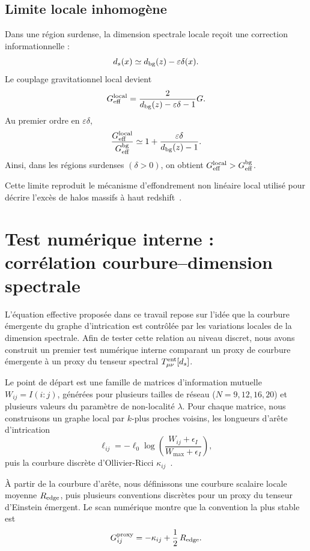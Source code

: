 \documentclass[11pt]{article}
\newcommand{\Geff}{G_{\rm eff}}
\newcommand{\ent}{\rm ent}
\begin{document}
\subsection{Limite locale inhomog\`ene}

Dans une r\'egion surdense, la dimension spectrale locale re\c{c}oit une correction
informationnelle :
\[
d_s(x)
\simeq
d_{\rm bg}(z)-\varepsilon\delta(x).
\]
Le couplage gravitationnel local devient
\[
\Geff^{\rm local}
=
\frac{2}{d_{\rm bg}(z)-\varepsilon\delta-1}G.
\]
Au premier ordre en $\varepsilon\delta$,
\[
\frac{\Geff^{\rm local}}{\Geff^{\rm bg}}
\simeq
1+
\frac{\varepsilon\delta}{d_{\rm bg}(z)-1}.
\]
Ainsi, dans les r\'egions surdenses $(\delta>0)$, on obtient
$\Geff^{\rm local}>\Geff^{\rm bg}$.

Cette limite reproduit le m\'ecanisme d'effondrement non lin\'eaire local utilis\'e
pour d\'ecrire l'exc\`es de halos massifs \`a haut redshift~\cite{hamdad2026p4}.


\section{Test numérique interne : corr\'elation courbure--dimension spectrale}
\label{sec:numerical-test}

L'\'equation effective propos\'ee dans ce travail repose sur l'id\'ee que la
courbure \'emergente du graphe d'intrication est contr\^ol\'ee par les variations
locales de la dimension spectrale. Afin de tester cette relation au niveau discret,
nous avons construit un premier test num\'erique interne comparant un proxy de
courbure \'emergente \`a un proxy du tenseur spectral $T_{\mu\nu}^{\ent}[d_s]$.

Le point de d\'epart est une famille de matrices d'information mutuelle
$W_{ij}=I(i:j)$, g\'en\'er\'ees pour plusieurs tailles de r\'eseau
($N=9, 12, 16, 20$) et plusieurs valeurs du param\`etre de
non-localit\'e $\lambda$. Pour chaque matrice, nous construisons un graphe local
par $k$-plus proches voisins, les longueurs d'ar\^ete d'intrication
\[
\ell_{ij}
=
-\ell_0\log\!\left(
\frac{W_{ij}+\epsilon_I}{W_{\max}+\epsilon_I}
\right),
\]
puis la courbure discr\`ete d'Ollivier-Ricci $\kappa_{ij}$~\cite{ollivier2009}.

\`A partir de la courbure d'ar\^ete, nous d\'efinissons une courbure scalaire locale
moyenne $R_{\rm edge}$, puis plusieurs conventions discr\`etes pour un proxy du
tenseur d'Einstein \'emergent. Le scan num\'erique montre que la convention la
plus stable est
\[
G_{ij}^{\rm proxy}
=
-\kappa_{ij}
+
\frac{1}{2}\,R_{\rm edge}.
\]
\end{document}
